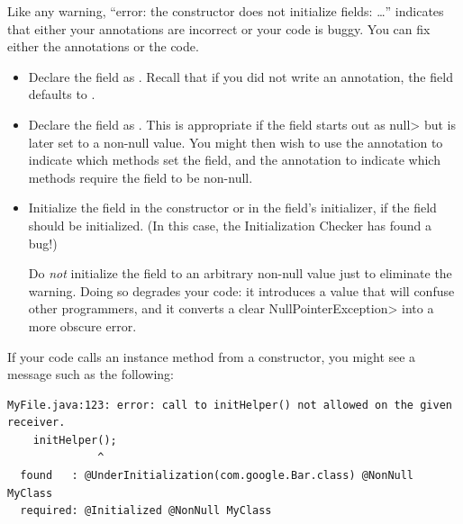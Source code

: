 


Like any warning, ``error:  the constructor does not initialize fields:
\ldots'' indicates that either your annotations are incorrect or your code
is buggy.  You can fix either the annotations or the code.

\begin{itemize}
\item
  Declare the field as .  Recall
  that if you did not write an annotation, the field defaults to
  .
\item
  Declare the field as .
  This is appropriate if the field starts out as \<null> but is later set
  to a non-null value.  You might then wish to use the
   annotation to indicate
  which methods set the field, and the
   annotation to indicate
  which methods require the field to be non-null.
\item
  Initialize the field in the constructor or in the field's initializer, if
  the field should be initialized.  (In this case, the Initialization
  Checker has found a bug!)

  Do \emph{not} initialize the field to an arbitrary non-null value just to
  eliminate the warning.  Doing so degrades your code:  it introduces a
  value that will confuse other programmers, and it converts a clear
  \<NullPointerException> into a more obscure error.
\end{itemize}


If your code calls an instance method from a constructor, you might see a
message such as the following:

\begin{Verbatim}
MyFile.java:123: error: call to initHelper() not allowed on the given receiver.
    initHelper();
              ^
  found   : @UnderInitialization(com.google.Bar.class) @NonNull MyClass
  required: @Initialized @NonNull MyClass
\end{Verbatim}

